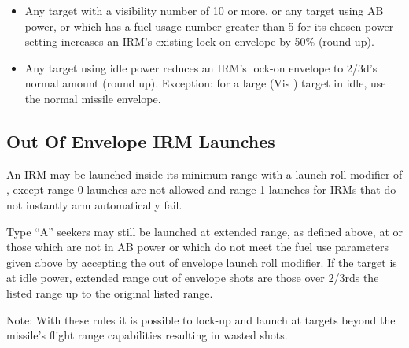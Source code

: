 \begin{advancedrules}
    \begin{itemize}

        \item Any target with a visibility number of 10 or more, or any target using AB power, or which has a fuel usage number greater than 5 for its chosen power setting increases an IRM's existing lock-on envelope by 50\% (round up).

        \item Any target using idle power reduces an IRM's lock-on envelope to 2/3d's normal amount (round up). Exception: for a large (Vis ) target in idle, use the normal missile envelope.

    \end{itemize}

    \subsection{Out Of Envelope IRM Launches}\label{rule:irm-out-of-envelope-launches} An IRM may be launched inside its minimum range with a launch roll modifier of , except range 0 launches are not allowed and range 1 launches for IRMs that do not instantly arm automatically fail.

    Type “A” seekers may still be launched at extended range, as defined above, at  or those which are not in AB power or which do not meet the fuel use parameters given above by accepting the  out of envelope launch roll modifier. If the target is at idle power, extended range out of envelope shots are those over 2/3rds the listed range up to the original listed range.

    Note: With these rules it is possible to lock-up and launch at targets beyond the missile's flight range capabilities resulting in wasted shots.

\end{advancedrules}
